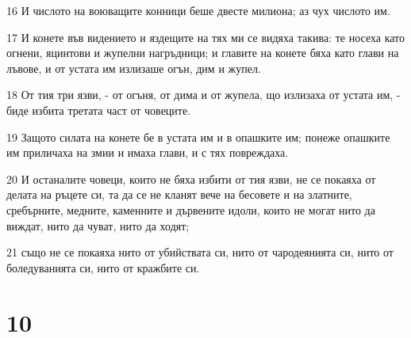 \par 16 И числото на воюващите конници беше двесте милиона; аз чух числото им.
\par 17 И конете във видението и яздещите на тях ми се видяха такива: те носеха като огнени, яцинтови и жупелни нагръдници; и главите на конете бяха като глави на лъвове, и от устата им излизаше огън, дим и жупел.
\par 18 От тия три язви, - от огъня, от дима и от жупела, що излизаха от устата им, - биде избита третата част от човеците.
\par 19 Защото силата на конете бе в устата им и в опашките им; понеже опашките им приличаха на змии и имаха глави, и с тях повреждаха.
\par 20 И останалите човеци, които не бяха избити от тия язви, не се покаяха от делата на ръцете си, та да се не кланят вече на бесовете и на златните, сребърните, медните, каменните и дървените идоли, които не могат нито да виждат, нито да чуват, нито да ходят;
\par 21 също не се покаяха нито от убийствата си, нито от чародеянията си, нито от боледуванията си, нито от кражбите си.

\chapter{10}

